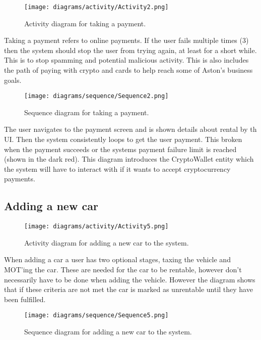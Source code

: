     \begin{figure}[H]
      \centering
      \texttt{[image: diagrams/activity/Activity2.png]}
      \caption{Activity diagram for taking a payment.}
      \label{fig:takePaymentActivity}
    \end{figure}

    Taking a payment refers to online payments. If the user fails multiple times (3) then the system should stop
    the user from trying again, at least for a short while. This is to stop spamming and potential malicious activity.
    This is also includes the path of paying with crypto and cards to help reach some of Aston's business goals.

    \begin{figure}[H]
      \centering
      \texttt{[image: diagrams/sequence/Sequence2.png]}
      \caption{Sequence diagram for taking a payment.}
      \label{fig:takePaymentSequence}
    \end{figure}

    The user navigates to the payment screen and is shown details about rental by th UI. Then the system consistently
    loops to get the user payment. This broken when the payment succeeds or the systems payment failure
    limit is reached (shown in the dark red). This diagram introduces the CryptoWallet entity which the system will have
    to interact with if it wants to accept cryptocurrency payments.

  \newpage

  \subsection{Adding a new car}

    \begin{figure}[H]
      \centering
      \texttt{[image: diagrams/activity/Activity5.png]}
      \caption{Activity diagram for adding a new car to the system.}
      \label{fig:newCarActivity}
    \end{figure}

    When adding a car a user has two optional stages, taxing the vehicle and MOT'ing the car. These are needed for the 
    car to be rentable, however don't necessarily have to be done when adding the vehicle. However the diagram shows that
    if these criteria are not met the car is marked as unrentable until they have been fulfilled.

    \begin{figure}[H]
      \centering
      \texttt{[image: diagrams/sequence/Sequence5.png]}
      \caption{Sequence diagram for adding a new car to the system.}
      \label{fig:newCarSequence}
    \end{figure}

